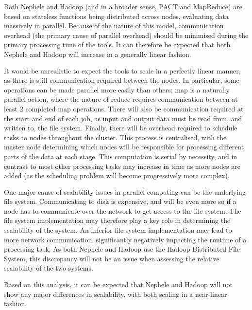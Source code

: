 Both Nephele and Hadoop (and in a broader sense, PACT and MapReduce) are based on stateless functions being distributed across nodes, evaluating data massively in parallel. Because of the nature of this model, communication overhead (the primary cause of parallel overhead) should be minimised during the primary processing time of the tools. It can therefore be expected that both Nephele and Hadoop will increase in a generally linear fashion.

It would be unrealistic to expect the tools to scale in a perfectly linear manner, as there is still communication required between the nodes. In particular, some operations can be made parallel more easily than others; map is a naturally parallel action, where the nature of reduce requires communication between at least 2 completed map operations. There will also be communication required at the start and end of each job, as input and output data must be read from, and written to, the file system. Finally, there will be overhead required to schedule tasks to nodes throughout the cluster. This process is centralised, with the master node determining which nodes will be responsible for processing different parts of the data at each stage. This computation is serial by necessity, and in contrast to most other processing tasks may increase in time as more nodes are added (as the scheduling problem will become progressively more complex). 

One major cause of scalability issues in parallel computing can be the underlying file system. Communicating to disk is expensive, and will be even more so if a node has to communicate over the network to get access to the file system. The file system implementation may therefore play a key role in determining the scalability of the system. An inferior file system implementation may lead to more network communication, significantly negatively impacting the runtime of a processing task. As both Nephele and Hadoop use the Hadoop Distributed File System, this discrepancy will not be an issue when assessing the relative scalability of the two systems.

Based on this analysis, it can be expected that Nephele and Hadoop will not show any major differences in scalability, with both scaling in a near-linear fashion.